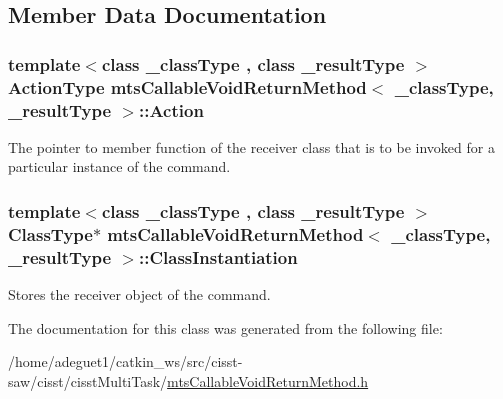 \subsection{Member Data Documentation}
\hypertarget{classmts_callable_void_return_method_ae6e1e00e4a13c6e6a6047323adf7707d}{
\subsubsection[{Action}]{\setlength{\rightskip}{0pt plus 5cm}template$<$class \-\_\-class\-Type , class \-\_\-result\-Type $>$ {\bf Action\-Type} {\bf mts\-Callable\-Void\-Return\-Method}$<$ \-\_\-class\-Type, \-\_\-result\-Type $>$\-::Action\hspace{0.3cm}{\ttfamily [protected]}}}\label{classmts_callable_void_return_method_ae6e1e00e4a13c6e6a6047323adf7707d}
The pointer to member function of the receiver class that is to be invoked for a particular instance of the command. \hypertarget{classmts_callable_void_return_method_a38ecd87e4473a2f42fde5567cd637937}{
\subsubsection[{Class\-Instantiation}]{\setlength{\rightskip}{0pt plus 5cm}template$<$class \-\_\-class\-Type , class \-\_\-result\-Type $>$ {\bf Class\-Type}$\ast$ {\bf mts\-Callable\-Void\-Return\-Method}$<$ \-\_\-class\-Type, \-\_\-result\-Type $>$\-::Class\-Instantiation\hspace{0.3cm}{\ttfamily [protected]}}}\label{classmts_callable_void_return_method_a38ecd87e4473a2f42fde5567cd637937}
Stores the receiver object of the command. 

The documentation for this class was generated from the following file\-:\begin{DoxyCompactItemize}
\item 
/home/adeguet1/catkin\-\_\-ws/src/cisst-\/saw/cisst/cisst\-Multi\-Task/\hyperlink{mts_callable_void_return_method_8h}{mts\-Callable\-Void\-Return\-Method.\-h}\end{DoxyCompactItemize}
